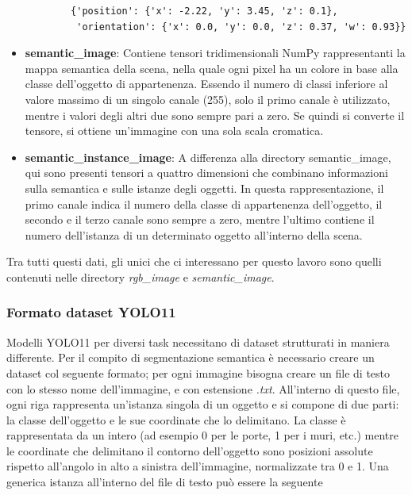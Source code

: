 \documentclass[12pt]{report}
\begin{document}
\begin{itemize}
	\begin{verbatim}
		{'position': {'x': -2.22, 'y': 3.45, 'z': 0.1},
		 'orientation': {'x': 0.0, 'y': 0.0, 'z': 0.37, 'w': 0.93}}
	\end{verbatim}
	
	\item \textbf{semantic\_image}: Contiene tensori tridimensionali NumPy rappresentanti la mappa semantica della scena, nella quale ogni pixel ha un colore in base alla classe dell'oggetto di appartenenza. Essendo il numero di classi inferiore al valore massimo di un singolo canale (255), solo il primo canale è utilizzato, mentre i valori degli altri due sono sempre pari a zero. Se quindi si converte il tensore, si ottiene un'immagine con una sola scala cromatica.
	
	\item \textbf{semantic\_instance\_image}: A differenza alla directory semantic\_image, qui sono presenti tensori a quattro dimensioni che combinano informazioni sulla semantica e sulle istanze degli oggetti. In questa rappresentazione, il primo canale indica il numero della classe di appartenenza dell'oggetto, il secondo e il terzo canale sono sempre a zero, mentre l'ultimo contiene il numero dell'istanza di un determinato oggetto all'interno della scena.
\end{itemize}

Tra tutti questi dati, gli unici che ci interessano per questo lavoro sono quelli contenuti nelle directory \textit{rgb\_image} e \textit{semantic\_image}.

\subsubsection{Formato dataset YOLO11}
\label{sec:formato_dataset_yolo11}

Modelli YOLO11 per diversi task necessitano di dataset strutturati in maniera differente. Per il compito di segmentazione semantica è necessario creare un dataset col seguente formato; per ogni immagine bisogna creare un file di testo con lo stesso nome dell'immagine, e con estensione \textit{.txt}. All'interno di questo file, ogni riga rappresenta un'istanza singola di un oggetto e si compone di due parti: la classe dell'oggetto e le sue coordinate che lo delimitano. La classe è rappresentata da un intero (ad esempio 0 per le porte, 1 per i muri, etc.) mentre le coordinate che delimitano il contorno dell'oggetto sono posizioni assolute rispetto all'angolo in alto a sinistra dell'immagine, normalizzate tra 0 e 1. Una generica istanza all'interno del file di testo può essere la seguente
\end{document}
